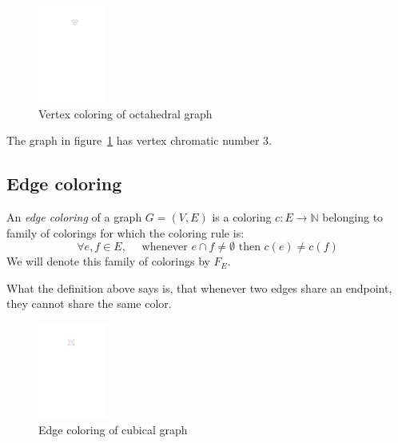 \begin{figure}[H]
    \centering
    \includegraphics[width=0.2\textwidth]{../Resources/Figs/octahedral_vtx_colr.pdf}
    \caption{Vertex coloring of octahedral graph}
    \label{fig:octahedral_vtx_coloring}
\end{figure}

The graph in figure~\ref{fig:octahedral_vtx_coloring} has vertex chromatic number 3.

\subsection{Edge coloring}

\begin{definition}
    An \textit{edge coloring} of a graph $G=(V,E)$ is a coloring $c: E \rightarrow \mathbb{N}$ belonging to family of colorings for which the coloring rule is: 
    \begin{equation}\label{eqn:edge_rule}
     \forall e,f \in E, \quad \text{ whenever } e \cap f \neq \emptyset \text{ then } c(e) \neq c(f) \tag{$R_E$}
    \end{equation}
    We will denote this family of colorings by $F_E$.
   
\end{definition}

What the definition above says is, that whenever two edges share an endpoint, they cannot share the same color. 

\begin{figure}[H]
    \centering
    \includegraphics[width=0.2\textwidth]{../Resources/Figs/cubical_edg_colr.pdf}
    \caption{Edge coloring of cubical graph}
    \label{fig:cubical_edge_coloring}
\end{figure}

